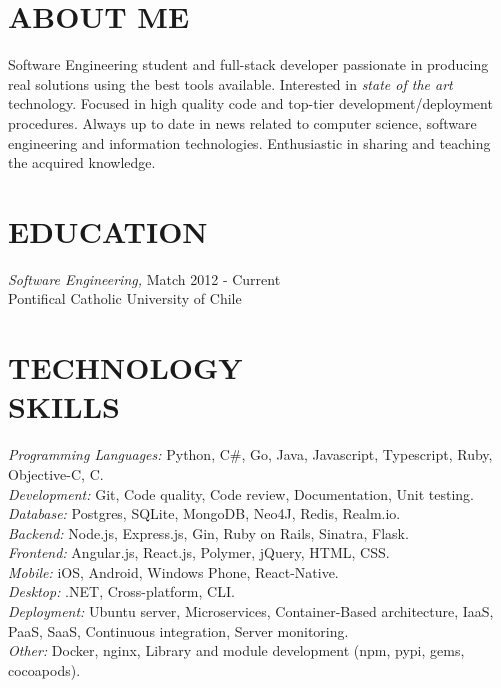 \documentclass[margin, 10pt]{res} %
\begin{document}
\begin{resume}


\section{ABOUT ME}

Software Engineering student and full-stack developer passionate in producing real solutions using the best tools available. Interested in \textit{state of the art} technology. Focused in high quality code and top-tier development/deployment procedures. Always up to date in news related to computer science, software engineering and information technologies. Enthusiastic in sharing and teaching the acquired knowledge.


\section{EDUCATION}

{\sl Software Engineering,}  \hfill Match 2012 - Current \\
Pontifical Catholic University of Chile\\


\section{TECHNOLOGY \\ SKILLS}

{\sl Programming Languages:}  Python, C\#, Go, Java, Javascript, Typescript, Ruby, Objective-C, C. \\
{\sl Development:} Git, Code quality, Code review, Documentation, Unit testing. \\
{\sl Database:} Postgres, SQLite, MongoDB, Neo4J, Redis, Realm.io. \\
{\sl Backend:} Node.js, Express.js, Gin, Ruby on Rails, Sinatra, Flask. \\
{\sl Frontend:}  Angular.js, React.js, Polymer, jQuery, HTML, CSS. \\
{\sl Mobile:}   iOS, Android, Windows Phone, React-Native. \\
{\sl Desktop:}   .NET, Cross-platform, CLI. \\
{\sl Deployment:}   Ubuntu server, Microservices, Container-Based architecture, IaaS, PaaS, SaaS, Continuous integration, Server monitoring. \\
{\sl Other:}  Docker, nginx, Library and module development (npm, pypi, gems, cocoapods). \\


\end{resume}
\end{document}
